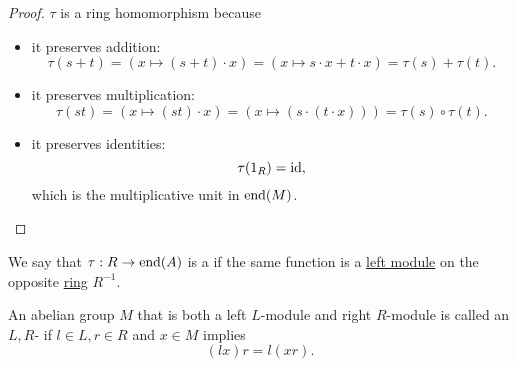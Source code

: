 \begin{proof}
  \( \tau \) is a ring homomorphism because
  \begin{itemize}
    \item it preserves addition:
          \begin{equation*}
            \tau(s + t)
            =
            (x \mapsto (s + t) \cdot x)
            =
            (x \mapsto s \cdot x + t \cdot x)
            =
            \tau(s) + \tau(t).
          \end{equation*}

    \item it preserves multiplication:
          \begin{equation*}
            \tau(st)
            =
            (x \mapsto (st) \cdot x)
            =
            (x \mapsto (s \cdot (t \cdot x)))
            =
            \tau(s) \circ \tau(t).
          \end{equation*}

    \item it preserves identities:
          \begin{equation*}
            \tau(1_R)
            =
            \operatorname{id},
          \end{equation*}
          which is the multiplicative unit in \( \operatorname{end}(M) \).
  \end{itemize}
\end{proof}

\begin{definition}\label{def:right_module}
  We say that \( \tau: R \to \operatorname{end}(A) \) is a  if the same function is a \hyperref[def:left_module]{left module} on the opposite \hyperref[def:opposite_ring]{ring} \( R^{-1} \).
\end{definition}

\begin{definition}\label{def:bimodule}
  An abelian group \( M \) that is both a left \( L \)-module and right \( R \)-module is called an \( L, R \)- if \( l \in L, r \in R \) and \( x \in M \) implies
  \begin{equation*}
    (lx)r = l(xr).
  \end{equation*}
\end{definition}

